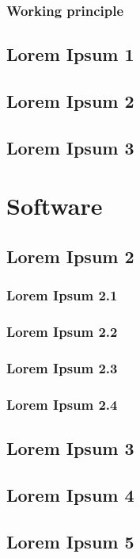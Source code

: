 \subsubsection{Working principle}
\subsection{Lorem Ipsum 1}
\subsection{Lorem Ipsum 2}
\subsection{Lorem Ipsum 3}
\section{Software}
\subsection{Lorem Ipsum 2}
\subsubsection{Lorem Ipsum 2.1}
\subsubsection{Lorem Ipsum 2.2}
\subsubsection{Lorem Ipsum 2.3}
\subsubsection{Lorem Ipsum 2.4}
\subsection{Lorem Ipsum 3}
\subsection{Lorem Ipsum 4}
\subsection{Lorem Ipsum 5}